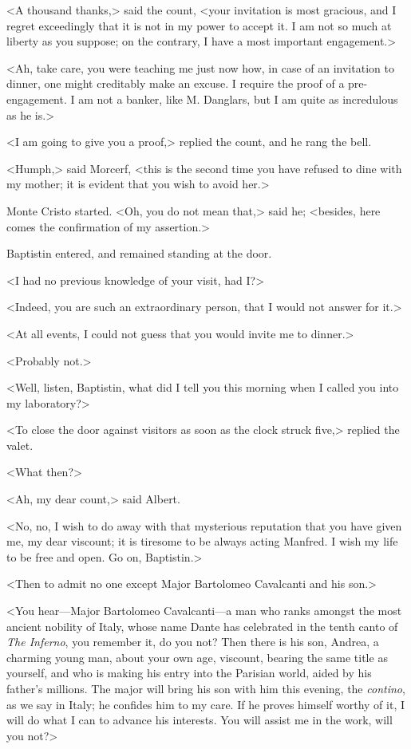  <A thousand thanks,> said the count, <your invitation is most gracious, and I regret exceedingly that it is not in my power to accept it. I am not so much at liberty as you suppose; on the contrary, I have a most important engagement.> 

 <Ah, take care, you were teaching me just now how, in case of an invitation to dinner, one might creditably make an excuse. I require the proof of a pre-engagement. I am not a banker, like M. Danglars, but I am quite as incredulous as he is.> 

 <I am going to give you a proof,> replied the count, and he rang the bell. 

 <Humph,> said Morcerf, <this is the second time you have refused to dine with my mother; it is evident that you wish to avoid her.> 

 Monte Cristo started. <Oh, you do not mean that,> said he; <besides, here comes the confirmation of my assertion.> 

 Baptistin entered, and remained standing at the door. 

 <I had no previous knowledge of your visit, had I?> 

 <Indeed, you are such an extraordinary person, that I would not answer for it.> 

 <At all events, I could not guess that you would invite me to dinner.> 

 <Probably not.> 

 <Well, listen, Baptistin, what did I tell you this morning when I called you into my laboratory?> 

 <To close the door against visitors as soon as the clock struck five,> replied the valet. 

 <What then?> 

 <Ah, my dear count,> said Albert. 

 <No, no, I wish to do away with that mysterious reputation that you have given me, my dear viscount; it is tiresome to be always acting Manfred. I wish my life to be free and open. Go on, Baptistin.> 

 <Then to admit no one except Major Bartolomeo Cavalcanti and his son.> 

 <You hear—Major Bartolomeo Cavalcanti—a man who ranks amongst the most ancient nobility of Italy, whose name Dante has celebrated in the tenth canto of \textit{The Inferno}, you remember it, do you not? Then there is his son, Andrea, a charming young man, about your own age, viscount, bearing the same title as yourself, and who is making his entry into the Parisian world, aided by his father's millions. The major will bring his son with him this evening, the \textit{contino}, as we say in Italy; he confides him to my care. If he proves himself worthy of it, I will do what I can to advance his interests. You will assist me in the work, will you not?> 

